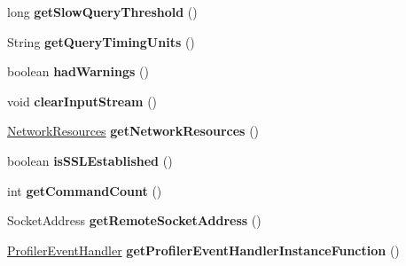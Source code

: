 \begin{DoxyCompactItemize}
long {\bfseries get\+Slow\+Query\+Threshold} ()
\item 
\mbox{\label{classcom_1_1mysql_1_1cj_1_1_native_session_a04027209ae60e8be006fe2dfbdc727ed}} 
String {\bfseries get\+Query\+Timing\+Units} ()
\item 
\mbox{\label{classcom_1_1mysql_1_1cj_1_1_native_session_a60f3ff60945cced4df0c1fa428f26b33}} 
boolean {\bfseries had\+Warnings} ()
\item 
\mbox{\label{classcom_1_1mysql_1_1cj_1_1_native_session_ad60f0b285b73faff0c7bd2e43c7db5ad}} 
void {\bfseries clear\+Input\+Stream} ()
\item 
\mbox{\label{classcom_1_1mysql_1_1cj_1_1_native_session_a2ddd406f0cb65786c48592f0a602f3d5}} 
\mbox{\hyperlink{classcom_1_1mysql_1_1cj_1_1protocol_1_1_network_resources}{Network\+Resources}} {\bfseries get\+Network\+Resources} ()
\item 
\mbox{\label{classcom_1_1mysql_1_1cj_1_1_native_session_a0cb179e160997c904bc69c9f4a027433}} 
boolean {\bfseries is\+S\+S\+L\+Established} ()
\item 
\mbox{\label{classcom_1_1mysql_1_1cj_1_1_native_session_a4c2f6058cbddf7348adeb5ba32618ea6}} 
int {\bfseries get\+Command\+Count} ()
\item 
\mbox{\label{classcom_1_1mysql_1_1cj_1_1_native_session_a1b2b6019a770001c7d76252b458ac694}} 
Socket\+Address {\bfseries get\+Remote\+Socket\+Address} ()
\item 
\mbox{\label{classcom_1_1mysql_1_1cj_1_1_native_session_a4c605e5c384e769ae780fb015d9a2da5}} 
\mbox{\hyperlink{interfacecom_1_1mysql_1_1cj_1_1log_1_1_profiler_event_handler}{Profiler\+Event\+Handler}} {\bfseries get\+Profiler\+Event\+Handler\+Instance\+Function} ()
\item 
\mbox{\label{classcom_1_1mysql_1_1cj_1_1_native_session_a07fe80b10addfe76ac7399e85cc54916}} 

\end{DoxyCompactItemize}
